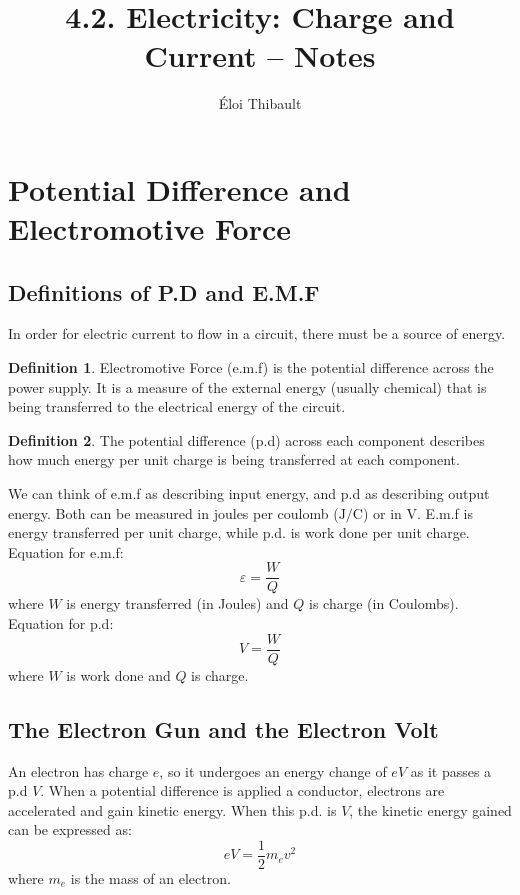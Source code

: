 \documentclass[11pt]{article}
\title{4.2. Electricity: Charge and Current – Notes}
\author{Éloi Thibault}
\begin{document}
\theoremstyle{definition}
\newtheorem{define}{Definition}[section]

\maketitle

\section{Potential Difference and Electromotive Force}

\subsection{Definitions of P.D and E.M.F}
In order for electric current to flow in a circuit, there must be a source of energy.

\begin{define}
	Electromotive Force (e.m.f) is the potential difference across the power supply. It is a measure of the external energy (usually chemical) that is being transferred to the electrical energy of the circuit.
\end{define}

\begin{define}
	The potential difference (p.d) across each component describes how much energy per unit charge is being transferred at each component.
\end{define}

We can think of e.m.f as describing input energy, and p.d as describing output energy. Both can be measured in joules per coulomb ($\si{\joule\per\coulomb}$) or in $\si{\volt}$. E.m.f is energy transferred per unit charge, while p.d. is work done per unit charge.\\
Equation for e.m.f:
\[\varepsilon = \frac{W}{Q}\]
where $W$ is energy transferred (in Joules) and $Q$ is charge (in Coulombs).\\

Equation for p.d:
\[V = \frac{W}{Q}\]
where $W$ is work done and $Q$ is charge.

\subsection{The Electron Gun and the Electron Volt}

An electron has charge $e$, so it undergoes an energy change of $eV$ as it passes a p.d $V$. When a potential difference is applied a conductor, electrons are accelerated and gain kinetic energy. When this p.d. is $V$, the kinetic energy gained can be expressed as:
\[eV=\frac{1}{2}m_{e}v^2\]
where $m_e$ is the mass of an electron.
\end{document}
